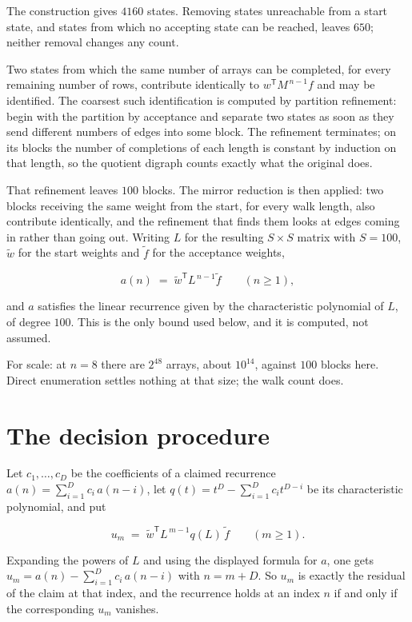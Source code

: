\documentclass[11pt]{article}
\theoremstyle{definition}
\begin{document}
The construction gives $4160$ states. Removing states unreachable from a start state, and states from which no accepting state can be reached, leaves $650$; neither removal changes any count.

Two states from which the same number of arrays can be completed, for every remaining number of rows, contribute identically to $w^{\mathsf T}M^{\,n-1}f$ and may be identified. The coarsest such identification is computed by partition refinement: begin with the partition by acceptance and separate two states as soon as they send different numbers of edges into some block. The refinement terminates; on its blocks the number of completions of each length is constant by induction on that length, so the quotient digraph counts exactly what the original does.

That refinement leaves $100$ blocks. The mirror reduction is then applied: two blocks receiving the same weight from the start, for every walk length, also contribute identically, and the refinement that finds them looks at edges coming in rather than going out. Writing $L$ for the resulting $S \times S$ matrix with $S = 100$, $\tilde w$ for the start weights and $\tilde f$ for the acceptance weights,

\[a(n) \;=\; \tilde w^{\mathsf T} L^{\,n-1} \tilde f \qquad (n \ge 1),\]

and $a$ satisfies the linear recurrence given by the characteristic polynomial of $L$, of degree $100$. This is the only bound used below, and it is computed, not assumed.

For scale: at $n = 8$ there are $2^{48}$ arrays, about $10^{14}$, against $100$ blocks here. Direct enumeration settles nothing at that size; the walk count does.

\section{The decision procedure}

Let $c_1,\dots,c_D$ be the coefficients of a claimed recurrence $a(n) = \sum_{i=1}^{D} c_i\,a(n-i)$, let $q(t) = t^{D} - \sum_{i=1}^{D} c_i t^{D-i}$ be its characteristic polynomial, and put

\[u_m \;=\; \tilde w^{\mathsf T} L^{\,m-1} q(L)\,\tilde f \qquad (m \ge 1).\]

Expanding the powers of $L$ and using the displayed formula for $a$, one gets $u_m = a(n) - \sum_{i=1}^{D} c_i\,a(n-i)$ with $n = m + D$. So $u_m$ is exactly the residual of the claim at that index, and the recurrence holds at an index $n$ if and only if the corresponding $u_m$ vanishes.
\end{document}
